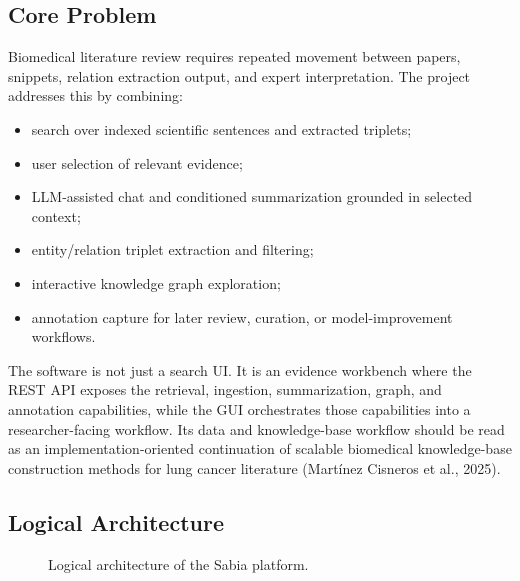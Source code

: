 \documentclass[10pt,letterpaper]{article}
\begin{document}
\subsection{Core Problem}

Biomedical literature review requires repeated movement between papers, snippets, relation extraction output, and expert interpretation. The project addresses this by combining:

\begin{itemize}
\item search over indexed scientific sentences and extracted triplets;
\item user selection of relevant evidence;
\item LLM-assisted chat and conditioned summarization grounded in selected context;
\item entity/relation triplet extraction and filtering;
\item interactive knowledge graph exploration;
\item annotation capture for later review, curation, or model-improvement workflows.
\end{itemize}

The software is not just a search UI. It is an evidence workbench where the REST API exposes the retrieval, ingestion, summarization, graph, and annotation capabilities, while the GUI orchestrates those capabilities into a researcher-facing workflow. Its data and knowledge-base workflow should be read as an implementation-oriented continuation of scalable biomedical knowledge-base construction methods for lung cancer literature (Mart\'inez Cisneros et al., 2025).

\subsection{Logical Architecture}


\begin{figure}[H]
\centering
{}
\caption{Logical architecture of the Sabia platform.}
\end{figure}
\end{document}
